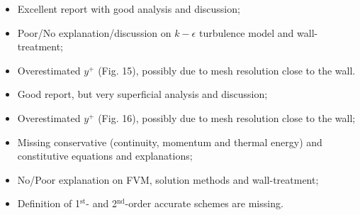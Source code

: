 \documentclass[14pt,twoside]{report}
\newcommand\blankpage{%
    \null
    \thispagestyle{empty}%
    \addtocounter{page}{-1}%
    \newpage}
\begin{document}
\medskip

  \begin{itemize}
%
     \item Excellent report with good analysis and discussion;
     \item Poor/No explanation/discussion on $k-\epsilon$ turbulence model and wall-treatment;
     \item Overestimated $y^{+}$ (Fig. 15), possibly due to mesh resolution close to the wall.
%
  \end{itemize}%

\clearpage 




\bigskip


\medskip

  \begin{itemize}
%
     \item Good report, but very superficial analysis and discussion;
     \item Overestimated $y^{+}$ (Fig. 16), possibly due to mesh resolution close to the wall;
     \item Missing conservative (continuity, momentum and thermal energy) and constitutive equations and explanations;
     \item No/Poor explanation on FVM, solution methods and wall-treatment;
     \item Definition of 1$^{\text{st}}$- and 2$^{\text{nd}}$-order accurate schemes are missing.
%
  \end{itemize}%

\clearpage 



\bigskip


\medskip
\end{document}
